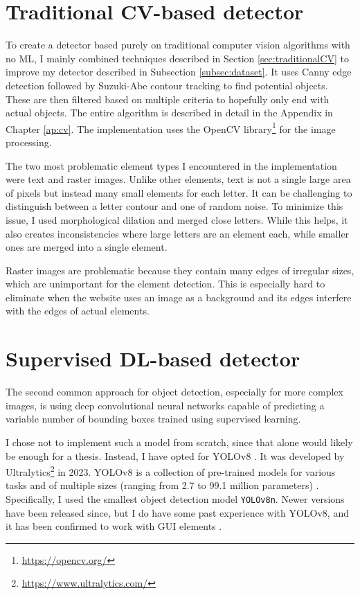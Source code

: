 \documentclass[
  digital,     %
  oneside,     %
  nosansbold,  %
  nocolorbold, %
  lof,         %
  lot,         %
]{fithesis4}
\begin{document}
\section{Traditional CV-based detector}
\label{sec:trad_cv_detector}

To create a detector based purely on traditional computer vision algorithms with no ML, I mainly combined techniques described in Section \ref{sec:traditionalCV} to improve my detector described in Subsection \ref{subsec:dataset}. It uses Canny edge detection followed by Suzuki-Abe contour tracking to find potential objects. These are then filtered based on multiple criteria to hopefully only end with actual objects. The entire algorithm is described in detail in the Appendix in Chapter \ref{ap:cv}. The implementation uses the OpenCV library\footnote{\url{https://opencv.org/}} for the image processing.

The two most problematic element types I encountered in the implementation were text and raster images. Unlike other elements, text is not a single large area of pixels but instead many small elements for each letter. It can be challenging to distinguish between a letter contour and one of random noise. To minimize this issue, I used morphological dilation and merged close letters. While this helps, it also creates inconsistencies where large letters are an element each, while smaller ones are merged into a single element.

Raster images are problematic because they contain many edges of irregular sizes, which are unimportant for the element detection. This is especially hard to eliminate when the website uses an image as a background and its edges interfere with the edges of actual elements.

\section{Supervised DL-based detector}

The second common approach for object detection, especially for more complex images, is using deep convolutional neural networks capable of predicting a variable number of bounding boxes trained using supervised learning.

I chose not to implement such a model from scratch, since that alone would likely be enough for a thesis. Instead, I have opted for YOLOv8 \cite{yolov8_ultralytics}. It was developed by Ultralytics\footnote{\url{https://www.ultralytics.com/}} in 2023. YOLOv8 is a collection of pre-trained models for various tasks and of multiple sizes (ranging from 2.7 to 99.1 million parameters) \cite{ultralytics-docs}. Specifically, I used the smallest object detection model \texttt{YOLOv8n}. Newer versions have been released since, but I do have some past experience with YOLOv8, and it has been confirmed to work with GUI elements \cite{GUI_YOLO_comparison}. 
\end{document}
